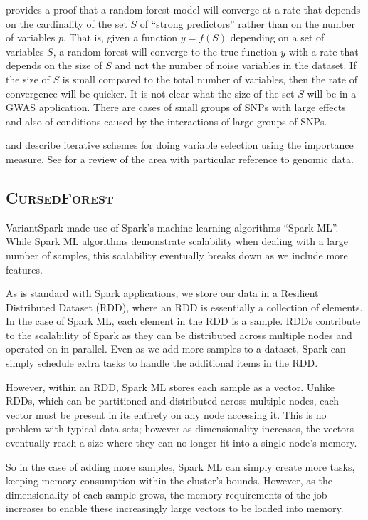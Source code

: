 \documentclass[10pt,letterpaper]{article}
\newcommand{\cursedforest}{\textsc{CursedForest}\xspace}
\begin{document}
\cite{Biau.2012} provides a proof that a random forest model will converge at a rate that depends on
the cardinality of the set $S$ of ``strong predictors'' rather than on the number of variables $p$. That is, given a
function $y=f(S)$ depending on a set of variables $S$, a random forest will converge to the true function $y$ with a
rate that depends on the size of $S$ and not the number of noise variables in the dataset. If the size of $S$ is small
compared to the total number of variables, then the rate of convergence will be quicker. It is not clear what the size
of the set $S$ will be in a GWAS application. There are cases of small groups of SNPs with large effects and also of
conditions caused by the interactions of large groups of SNPs.

\cite{Genuer.et.al.2010} and \cite{Diaz.and.Alvarez.2006} describe iterative schemes for doing variable selection using
the importance measure. See \cite{Chen.and.Ishwaran.2012} for a review of the area with particular reference to genomic
data.

\subsection{\cursedforest}
VariantSpark made use of Spark's machine learning algorithms ``Spark ML''. While Spark ML algorithms demonstrate
scalability when dealing with a large number of samples, this scalability eventually breaks down as we include more
features.

As is standard with Spark applications, we store our data in a Resilient Distributed Dataset (RDD), where an RDD is
essentially a collection of elements. In the case of Spark ML, each element in the RDD is a sample. RDDs contribute to
the scalability of Spark as they can be distributed across multiple nodes and operated on in parallel. Even as we add more
samples to a dataset, Spark can simply schedule extra tasks to handle the additional items in the RDD.

However, within an RDD, Spark ML stores each sample as a vector. Unlike RDDs, which can be partitioned and distributed
across multiple nodes, each vector must be present in its entirety on any node accessing it. This is no problem with
typical data sets; however as dimensionality increases, the vectors eventually reach a size where they can no longer fit
into a single node's memory.

So in the case of adding more samples, Spark ML can simply create more tasks, keeping memory consumption within the
cluster's bounds. However, as the dimensionality of each sample grows, the memory requirements of the job increases to
enable these increasingly large vectors to be loaded into memory.  
\end{document}
